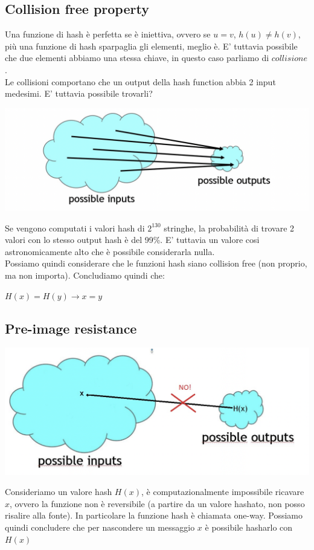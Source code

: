 \documentclass[11pt, oneside]{article}   	%
\begin{document}
\subsection*{Collision free property}
Una funzione di hash è perfetta se è iniettiva, ovvero se $u = v$, $h(u) \neq h(v)$, più una funzione di hash sparpaglia gli elementi, meglio è. E' tuttavia possibile che due elementi abbiamo una stessa chiave, in questo caso parliamo di $collisione$. \\
Le collisioni comportano che un output della hash function abbia 2 input medesimi. E' tuttavia possibile trovarli?
\begin{center}
\includegraphics[scale= 0.3]{h1}
\end{center}
Se vengono computati i valori hash di $2^{130}$ stringhe, la probabilità di trovare 2 valori con lo stesso output hash è del 99\%. E' tuttavia un valore cosi astronomicamente alto che è possibile considerarla nulla.\\
Possiamo quindi considerare che le funzioni hash siano collision free (non proprio, ma non importa). Concludiamo quindi che:
\begin{center}
$H(x) = H(y) \rightarrow x = y$
\end{center}

\subsection*{Pre-image resistance}
\begin{center}
\includegraphics[scale= 0.3]{h2}
\end{center}
Consideriamo un valore hash $H(x)$, è computazionalmente impossibile ricavare $x$, ovvero la funzione non è reversibile (a partire da un valore hashato, non posso risalire alla fonte). In particolare la funzione hash è chiamata one-way. Possiamo quindi concludere che per nascondere un messaggio $x$ è possibile hasharlo con $H(x)$
\end{document}
